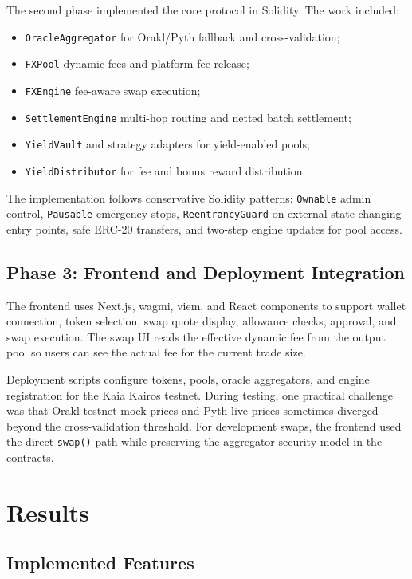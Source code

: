 \documentclass{article}
\begin{document}
The second phase implemented the core protocol in Solidity. The work included:

\begin{itemize}[leftmargin=*]
\item \texttt{OracleAggregator} for Orakl/Pyth fallback and cross-validation;
\item \texttt{FXPool} dynamic fees and platform fee release;
\item \texttt{FXEngine} fee-aware swap execution;
\item \texttt{SettlementEngine} multi-hop routing and netted batch settlement;
\item \texttt{YieldVault} and strategy adapters for yield-enabled pools;
\item \texttt{YieldDistributor} for fee and bonus reward distribution.
\end{itemize}

The implementation follows conservative Solidity patterns: \texttt{Ownable} admin control, \texttt{Pausable} emergency stops, \texttt{ReentrancyGuard} on external state-changing entry points, safe ERC-20 transfers, and two-step engine updates for pool access.

\subsection{Phase 3: Frontend and Deployment Integration}

The frontend uses Next.js, wagmi, viem, and React components to support wallet connection, token selection, swap quote display, allowance checks, approval, and swap execution. The swap UI reads the effective dynamic fee from the output pool so users can see the actual fee for the current trade size.

Deployment scripts configure tokens, pools, oracle aggregators, and engine registration for the Kaia Kairos testnet. During testing, one practical challenge was that Orakl testnet mock prices and Pyth live prices sometimes diverged beyond the cross-validation threshold. For development swaps, the frontend used the direct \texttt{swap()} path while preserving the aggregator security model in the contracts.

\section{Results}

\subsection{Implemented Features}
\end{document}
